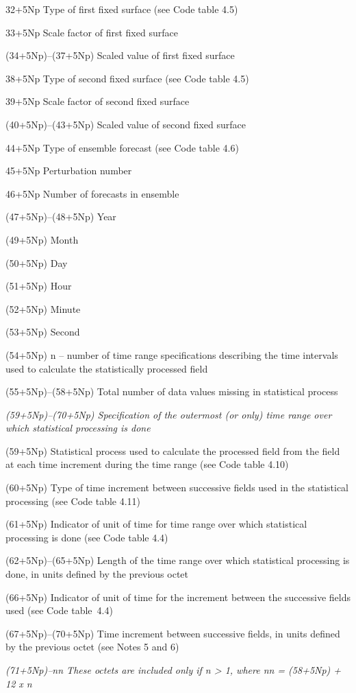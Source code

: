 32+5Np Type of first fixed surface (see Code table 4.5)

33+5Np Scale factor of first fixed surface

(34+5Np)--(37+5Np) Scaled value of first fixed surface

38+5Np Type of second fixed surface (see Code table 4.5)

39+5Np Scale factor of second fixed surface

(40+5Np)--(43+5Np) Scaled value of second fixed surface

44+5Np Type of ensemble forecast (see Code table 4.6)

45+5Np Perturbation number

46+5Np Number of forecasts in ensemble

(47+5Np)--(48+5Np) Year

(49+5Np) Month

(50+5Np) Day

(51+5Np) Hour

(52+5Np) Minute

(53+5Np) Second

(54+5Np) n -- number of time range specifications describing the time intervals used to calculate the statistically processed field

(55+5Np)--(58+5Np) Total number of data values missing in statistical process

\emph{(59+5Np)--(70+5Np) Specification of the outermost (or only) time range over which statistical processing is done}

(59+5Np) Statistical process used to calculate the processed field from the field at each time increment during the time range (see Code table 4.10)

(60+5Np) Type of time increment between successive fields used in the statistical processing (see Code table 4.11)

(61+5Np) Indicator of unit of time for time range over which statistical processing is done (see Code table 4.4)

(62+5Np)--(65+5Np) Length of the time range over which statistical processing is done, in units defined by the previous octet

(66+5Np) Indicator of unit of time for the increment between the successive fields used (see Code table~4.4)

(67+5Np)--(70+5Np) Time increment between successive fields, in units defined by the previous octet (see Notes 5 and 6)

\emph{(71+5Np)--nn These octets are included only if n \textgreater{} 1, where nn = (58+5Np) + 12 x n}

